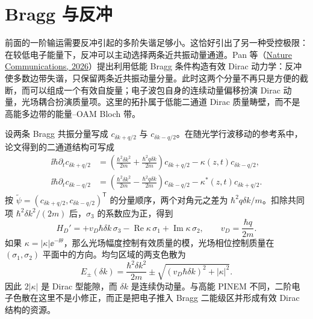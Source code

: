 \section{Bragg 与反冲}
前面的一阶输运需要反冲引起的多阶失谐足够小。这恰好引出了另一种受控极限：在较低电子能量下，反冲可以主动选择两条近共振动量通道。Pan 等（\href{https://doi.org/10.1038/s41467-026-76021-5}{Nature Communications, 2026}）提出利用低能 Bragg 条件构造有效 Dirac 动力学：反冲使多数边带失谐，只保留两条近共振动量分量。此时这两个分量不再只是方便的截断，而可以组成一个有效自旋量；电子波包自身的连续动量偏移扮演 Dirac 动量，光场耦合扮演质量项。这里的拓扑属于低能二通道 Dirac 质量畴壁，而不是高能多边带的能量--OAM Bloch 带。

设两条 Bragg 共振分量写成 $c_{\delta k+q/2}$ 与 $c_{\delta k-q/2}$。在随光学行波移动的参考系中，论文得到的二通道结构可写成
\begin{align}
\ii\hbar\partial_t c_{\delta k+q/2}
&=\left(\frac{\hbar^2\delta k^2}{2m}+\frac{\hbar^2q\delta k}{2m}\right)c_{\delta k+q/2}
-\kappa(z,t)c_{\delta k-q/2},\\
\ii\hbar\partial_t c_{\delta k-q/2}
&=\left(\frac{\hbar^2\delta k^2}{2m}-\frac{\hbar^2q\delta k}{2m}\right)c_{\delta k-q/2}
-\kappa^*(z,t)c_{\delta k+q/2}.
\label{eq:ch03-dirac-coupled}
\end{align}
按 $\widetilde\psi=(c_{\delta k+q/2},c_{\delta k-q/2})^{\mathsf T}$ 的分量顺序，两个对角元之差为 $\hbar^2q\delta k/m$。扣除共同项 $\hbar^2\delta k^2/(2m)$ 后，$\sigma_3$ 的系数应为正，得到
\begin{equation}
H_D'=+v_D\hbar\delta k\,\sigma_3
-\operatorname{Re}\kappa\,\sigma_1
+\operatorname{Im}\kappa\,\sigma_2,
\qquad
v_D=\frac{\hbar q}{2m}.
\label{eq:ch03-dirac-effective}
\end{equation}
如果 $\kappa=|\kappa|\ee^{-\ii\theta}$，那么光场幅度控制有效质量的模，光场相位控制质量在 $(\sigma_1,\sigma_2)$ 平面中的方向。均匀区域的两支色散为
\begin{equation}
E_\pm(\delta k)=\frac{\hbar^2\delta k^2}{2m}
\pm\sqrt{(v_D\hbar\delta k)^2+|\kappa|^2}.
\label{eq:ch03-dirac-dispersion}
\end{equation}
因此 $2|\kappa|$ 是 Dirac 型能隙，而 $\delta k$ 是连续伪动量。与高能 PINEM 不同，二阶电子色散在这里不是小修正，而正是把电子推入 Bragg 二能级区并形成有效 Dirac 结构的资源。

